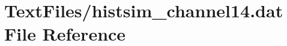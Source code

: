 \hypertarget{TextFiles_2histsim__channel14_8dat}{}\section{Text\+Files/histsim\+\_\+channel14.dat File Reference}
\label{TextFiles_2histsim__channel14_8dat}
